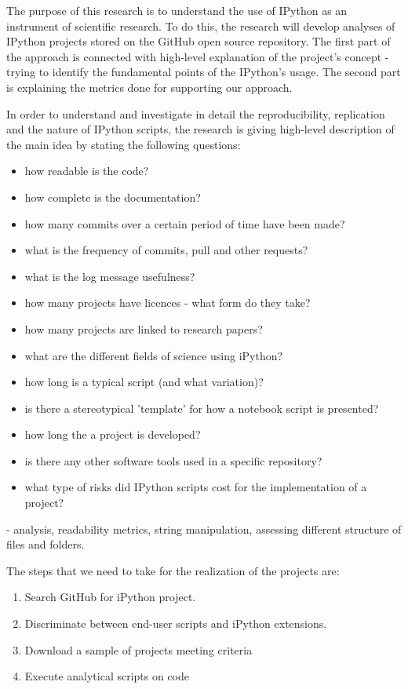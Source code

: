 
The purpose of this research is to understand the use of IPython as an instrument of scientific research.  To do this, the research will develop analyses of IPython projects stored on the GitHub open source repository. The first part of the approach is connected with high-level explanation of the project's concept - trying to identify the fundamental points of the IPython's usage. The second part is explaining the metrics done for supporting our approach.

In order to understand and investigate in detail the reproducibility, replication and the nature of IPython scripts, the research is giving high-level description of the main idea by stating the following questions:

\begin{itemize}
\item how readable is the code?
\item how complete is the documentation?
\item how many commits over a certain period of time have been made?
\item what is the frequency of commits, pull and other requests?
\item what is the log message usefulness?
\item how many projects have licences - what form do they take?
\item how many projects are linked to research papers?
\item what are the different fields of science using iPython?
\item how long is a typical script (and what variation)?
\item is there a stereotypical 'template' for how a notebook script is presented?
\item how long the a project is developed?
\item is there any other software tools used in a specific repository? 
\item what type of risks did IPython scripts cost for the implementation of a project? 

\end{itemize}

- analysis, readability metrics, string manipulation, assessing different structure of files and folders.

The steps that we need to take for the realization of the projects are:

\begin{enumerate}
\item Search GitHub for iPython project.
\item Discriminate between end-user scripts and iPython extensions.
\item Download a sample of projects meeting criteria
\item Execute analytical scripts on code
\end{enumerate}



